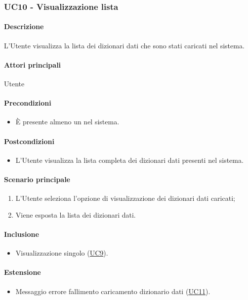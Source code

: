 \subsubsection{UC10 - Visualizzazione lista }\label{UC10}
\paragraph*{Descrizione}
L’Utente visualizza la lista dei dizionari dati che sono stati caricati nel sistema.

\paragraph*{Attori principali}
Utente

\paragraph*{Precondizioni}
\begin{itemize}
  \item È presente almeno un  nel sistema.  
\end{itemize}

\paragraph*{Postcondizioni}
\begin{itemize}
  \item L’Utente visualizza la lista completa dei dizionari dati presenti nel sistema.
\end{itemize}

\paragraph*{Scenario principale}
\begin{enumerate}
  \item L’Utente seleziona l’opzione di visualizzazione dei dizionari dati caricati;
  \item Viene esposta la lista dei dizionari dati.  
\end{enumerate}

\paragraph*{Inclusione}
\begin{itemize}
  \item Visualizzazione singolo  (\hyperref[UC9]{UC9}).
\end{itemize}

\paragraph*{Estensione}
\begin{itemize}
  \item Messaggio errore fallimento caricamento dizionario dati (\hyperref[UC11]{UC11}).
\end{itemize}
